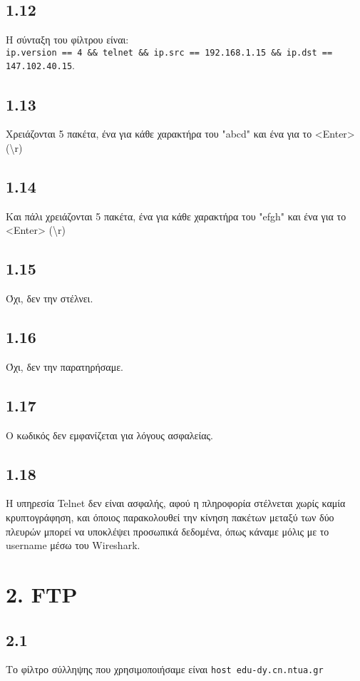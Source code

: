 		\subsection*{1.12}
			Η σύνταξη του φίλτρου είναι: \\
			\verb|ip.version == 4 && telnet && ip.src == 192.168.1.15 && ip.dst == 147.102.40.15|.
		
		\subsection*{1.13}
			Χρειάζονται 5 πακέτα, ένα για κάθε χαρακτήρα του "abcd" και ένα για το <Enter> (\textbackslash r)
		
		\subsection*{1.14}
			Και πάλι χρειάζονται 5 πακέτα, ένα για κάθε χαρακτήρα του "efgh" και ένα για το <Enter> (\textbackslash r)
		
		\subsection*{1.15}
			Όχι, δεν την στέλνει.
		
		\subsection*{1.16}
			Όχι, δεν την παρατηρήσαμε.
		
		\subsection*{1.17}
			Ο κωδικός δεν εμφανίζεται για λόγους ασφαλείας.
		
		\subsection*{1.18}
			Η υπηρεσία Telnet δεν είναι ασφαλής, αφού η πληροφορία στέλνεται χωρίς καμία κρυπτογράφηση, και όποιος παρακολουθεί την κίνηση πακέτων μεταξύ των δύο πλευρών μπορεί να υποκλέψει προσωπικά δεδομένα, όπως κάναμε μόλις με το username μέσω του Wireshark.
		
	\section*{2. FTP}
		
		\subsection*{2.1}
			Το φίλτρο σύλληψης που χρησιμοποιήσαμε είναι \verb|host edu-dy.cn.ntua.gr|
		
